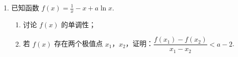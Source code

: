 \begin{description}
\begin{enumerate}[leftmargin=5pt]
\begin{enumerate}
\item 记 \(20\text{ 件}\) 产品中恰有 \(2\text{ 件}\) 不合格品的概率为 \(f(p)\)，求 \(f(p)\) 的最大值点 \(p_0\)；
\item 现对一箱产品检验了 \(20\text{ 件}\)，结果恰有 \(2\text{ 件}\) 不合格品，以（1）中确定的 \(p_0\) 作为 \(p\) 的值. 已知每件产品的检验费用为 \(2\text{ 元}\)，若有不合格品进入用户手中，则工厂要对每件不合格品支付 \(25\text{ 元}\) 的赔偿费用.
\begin{enumerate}
\item 若不对该箱余下的产品作检验，这一箱产品的检验费用与赔偿费用的和记为 \(X\)，求 \(EX\)；
\item 以检验费用与赔偿费用和的期望值为决策依据，是否该对这箱余下的所有产品作检验？
\end{enumerate}
\end{enumerate}

        \item 已知函数 \(f(x)=\frac1x-x+a\ln x\).

\begin{enumerate}
\item 讨论 \(f(x)\) 的单调性；
\item 若 \(f(x)\) 存在两个极值点 \(x_1\)，\(x_2\)，证明：\(\dfrac{f(x_1)-f(x_2)}{x_1-x_2}<a-2\).
\end{enumerate}

    \end{enumerate}

\end{description}

